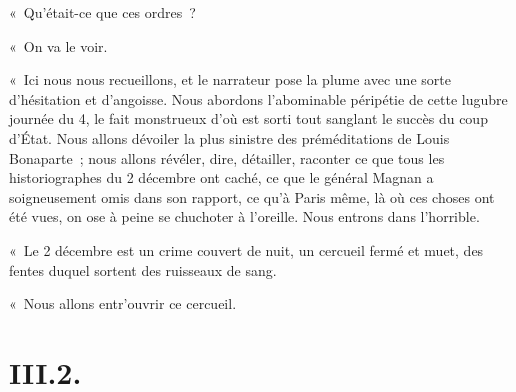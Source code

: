 \documentclass[french,twoside]{book} %
\begin{document}
« Qu’était-ce que ces ordres ?\par
« On va le voir.\par
« Ici nous nous recueillons, et le narrateur pose la plume avec une sorte d’hésitation et d’angoisse. Nous abordons l’abominable péripétie de cette lugubre journée du 4, le fait monstrueux d’où est sorti tout sanglant le succès du coup d’État. Nous allons dévoiler la plus sinistre des préméditations de Louis Bonaparte ; nous allons révéler, dire, détailler, raconter ce que tous les historiographes du 2 décembre ont caché, ce que le général Magnan a soigneusement omis dans son rapport, ce qu’à Paris même, là où ces choses ont été vues, on ose à peine se chuchoter à l’oreille. Nous entrons dans l’horrible.\par
« Le 2 décembre est un crime couvert de nuit, un cercueil fermé et muet, des fentes duquel sortent des ruisseaux de sang.\par
« Nous allons entr’ouvrir ce cercueil.

\section[{III.2.}]{III.2.}
\end{document}
